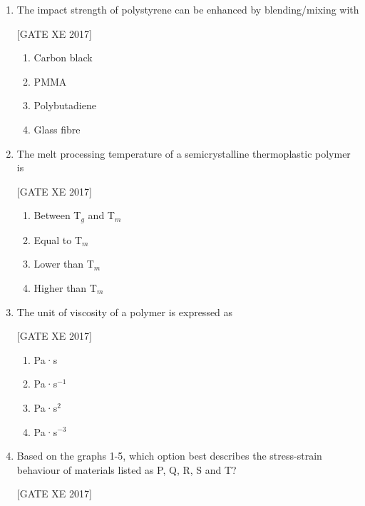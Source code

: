 \documentclass[journal,12pt,onecolumn]{IEEEtran}
\theoremstyle{remark}
\begin{document}
\begin{enumerate}
\item The impact strength of polystyrene can be enhanced by blending/mixing with  

\hfill [GATE XE 2017]  

\begin{multicols}{2}  
\begin{enumerate}  
\item Carbon black  
\item PMMA  
\item Polybutadiene  
\item Glass fibre  
\end{enumerate}  
\end{multicols}  

\item The melt processing temperature of a semicrystalline thermoplastic polymer is  

\hfill [GATE XE 2017]  

\begin{multicols}{2}  
\begin{enumerate}  
\item Between T$_g$ and T$_m$  
\item Equal to T$_m$  
\item Lower than T$_m$  
\item Higher than T$_m$  
\end{enumerate}  
\end{multicols}  

\item The unit of viscosity of a polymer is expressed as  

\hfill [GATE XE 2017]  

\begin{multicols}{2}  
\begin{enumerate}  
\item Pa·s  
\item Pa·s$^{-1}$  
\item Pa·s$^{2}$  
\item Pa·s$^{-3}$  
\end{enumerate}  
\end{multicols}

\item Based on the graphs 1-5, which option best describes the stress-strain behaviour of materials listed as P, Q, R, S and T?

\hfill [GATE XE 2017]  


\end{enumerate}
\end{document}
